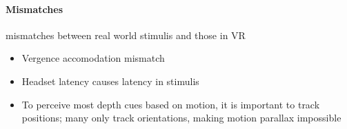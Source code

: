   \paragraph{Mismatches} mismatches between real world stimulis and those in
  VR
  \begin{itemize}
    \item Vergence accomodation mismatch
    \item Headset latency causes latency in stimulis
    \item To perceive most depth cues based on motion, it is important to track
    positions; many only track orientations, making motion parallax impossible
  \end{itemize}
